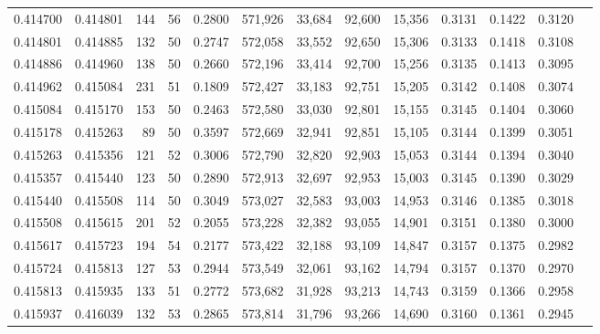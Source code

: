 \begin{tabular}{rrrrrrrrrrrrr}
0.414700 & 0.414801 &   144 &  56 &                                     0.2800 & 571,926 &  33,684 &  92,600 &  15,356 & 0.3131 & 0.1422 & 0.3120 \\
0.414801 & 0.414885 &   132 &  50 &                                     0.2747 & 572,058 &  33,552 &  92,650 &  15,306 & 0.3133 & 0.1418 & 0.3108 \\
0.414886 & 0.414960 &   138 &  50 &                                     0.2660 & 572,196 &  33,414 &  92,700 &  15,256 & 0.3135 & 0.1413 & 0.3095 \\
0.414962 & 0.415084 &   231 &  51 &                                     0.1809 & 572,427 &  33,183 &  92,751 &  15,205 & 0.3142 & 0.1408 & 0.3074 \\
0.415084 & 0.415170 &   153 &  50 &                                     0.2463 & 572,580 &  33,030 &  92,801 &  15,155 & 0.3145 & 0.1404 & 0.3060 \\
0.415178 & 0.415263 &    89 &  50 &                                     0.3597 & 572,669 &  32,941 &  92,851 &  15,105 & 0.3144 & 0.1399 & 0.3051 \\
0.415263 & 0.415356 &   121 &  52 &                                     0.3006 & 572,790 &  32,820 &  92,903 &  15,053 & 0.3144 & 0.1394 & 0.3040 \\
0.415357 & 0.415440 &   123 &  50 &                                     0.2890 & 572,913 &  32,697 &  92,953 &  15,003 & 0.3145 & 0.1390 & 0.3029 \\
0.415440 & 0.415508 &   114 &  50 &                                     0.3049 & 573,027 &  32,583 &  93,003 &  14,953 & 0.3146 & 0.1385 & 0.3018 \\
0.415508 & 0.415615 &   201 &  52 &                                     0.2055 & 573,228 &  32,382 &  93,055 &  14,901 & 0.3151 & 0.1380 & 0.3000 \\
0.415617 & 0.415723 &   194 &  54 &                                     0.2177 & 573,422 &  32,188 &  93,109 &  14,847 & 0.3157 & 0.1375 & 0.2982 \\
0.415724 & 0.415813 &   127 &  53 &                                     0.2944 & 573,549 &  32,061 &  93,162 &  14,794 & 0.3157 & 0.1370 & 0.2970 \\
0.415813 & 0.415935 &   133 &  51 &                                     0.2772 & 573,682 &  31,928 &  93,213 &  14,743 & 0.3159 & 0.1366 & 0.2958 \\
0.415937 & 0.416039 &   132 &  53 &                                     0.2865 & 573,814 &  31,796 &  93,266 &  14,690 & 0.3160 & 0.1361 & 0.2945 \\

\end{tabular}
